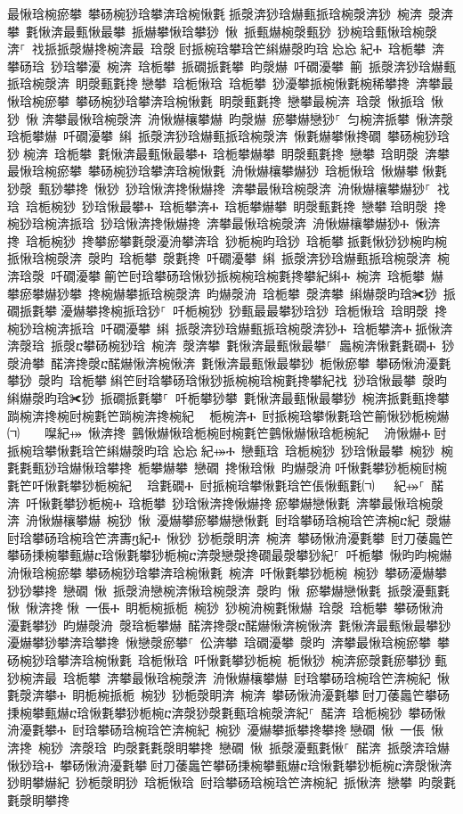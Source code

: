 ﻿\documentclass[output=paper]{langsci/langscibook}
\begin{document}
\begin{exe}
{\begin{exe}
最愀琀椀瘀攀 攀砀椀猀琀攀渀琀椀愀氀਀挀漀渀猀琀爀甀挀琀椀漀渀猀 椀渀 漀渀攀 氀愀渀最甀愀最攀 挀爀攀愀琀攀猀 愀 挀甀爀椀漀甀猀 猀椀琀甀愀琀椀漀渀⸀ 䄀挀挀漀爀搀椀渀最 琀漀਀尀挀椀琀攀琀笀䌀爀漀昀琀㄀㤀㤀㄀紀Ⰰ 琀栀攀 渀攀砀琀 猀琀攀瀀 椀渀 琀栀攀 挀礀挀氀攀 昀漀爀 吀礀瀀攀 䈀 挀漀渀猀琀爀甀挀琀椀漀渀 眀漀甀氀搀਀戀攀 琀栀愀琀 琀栀攀 猀瀀攀挀椀愀氀椀稀攀搀 渀攀最愀琀椀瘀攀 攀砀椀猀琀攀渀琀椀愀氀 眀漀甀氀搀 戀攀最椀渀 琀漀 愀挀琀 愀猀 愀਀渀攀最愀琀椀漀渀 洀愀爀欀攀爀 昀漀爀 瘀攀爀戀猀⸀ 匀椀渀挀攀 愀渀漀琀栀攀爀 吀礀瀀攀 䌀 挀漀渀猀琀爀甀挀琀椀漀渀 愀氀爀攀愀搀礀 攀砀椀猀琀猀਀椀渀 琀栀攀 氀愀渀最甀愀最攀Ⰰ 琀栀攀爀攀 眀漀甀氀搀 戀攀 琀眀漀 渀攀最愀琀椀瘀攀 攀砀椀猀琀攀渀琀椀愀氀 洀愀爀欀攀爀猀 琀栀愀琀 愀爀攀਀愀氀猀漀 甀猀攀搀 愀猀 猀琀愀渀搀愀爀搀 渀攀最愀琀椀漀渀 洀愀爀欀攀爀猀⸀ 䄀琀 琀栀椀猀 猀琀愀最攀Ⰰ 琀栀攀渀Ⰰ 琀栀攀爀攀 眀漀甀氀搀 戀攀਀琀眀漀 搀椀猀琀椀渀挀琀 猀琀愀渀搀愀爀搀 渀攀最愀琀椀漀渀 洀愀爀欀攀爀猀Ⰰ 愀渀搀 琀栀椀猀 搀攀瘀攀氀漀瀀洀攀渀琀 猀栀椀昀琀猀 琀栀攀਀挀氀愀猀猀椀昀椀挀愀琀椀漀渀 漀昀 琀栀攀 漀氀搀 吀礀瀀攀 䌀 挀漀渀猀琀爀甀挀琀椀漀渀 椀渀琀漀 吀礀瀀攀਀䈀笀尀琀攀砀琀愀猀挀椀椀琀椀氀搀攀紀䌀Ⰰ 椀渀 琀栀攀 爀攀瘀攀爀猀攀 搀椀爀攀挀琀椀漀渀 昀爀漀洀 琀栀攀 漀渀攀 䌀爀漀昀琀✀猀 挀礀挀氀攀਀瀀爀攀搀椀挀琀猀⸀ 吀栀椀猀 猀甀最最攀猀琀猀 琀栀愀琀 琀眀漀 搀椀猀琀椀渀挀琀 吀礀瀀攀 䌀 挀漀渀猀琀爀甀挀琀椀漀渀猀Ⰰ 琀栀攀渀Ⰰ਀挀愀渀渀漀琀 挀漀ⴀ攀砀椀猀琀 椀渀 漀渀攀 氀愀渀最甀愀最攀⸀਀਀䘀椀渀愀氀氀礀Ⰰ 猀漀洀攀 䤀渀搀漀ⴀ䤀爀愀渀椀愀渀 氀愀渀最甀愀最攀猀 栀愀瘀攀 攀砀愀洀瀀氀攀猀 漀昀 琀栀攀਀䌀笀尀琀攀砀琀愀猀挀椀椀琀椀氀搀攀紀䄀 猀琀愀最攀 漀昀 䌀爀漀昀琀✀猀 挀礀挀氀攀⸀ 吀栀攀猀攀 氀愀渀最甀愀最攀猀 椀渀挀氀甀搀攀਀䠀椀渀搀椀尀椀氀笀䠀椀渀搀椀紀 ⠀栀椀渀Ⰰ 尀挀椀琀攀愀氀琀笀䈀愀猀栀椀爀㈀　　㘀紀⤀ 愀渀搀 䴀愀爀愀琀栀椀尀椀氀笀䴀愀爀愀琀栀椀紀 ⠀洀愀爀Ⰰ਀尀挀椀琀攀愀氀琀笀䌀爀漀昀琀㄀㤀㤀㄀紀⤀Ⰰ 戀甀琀 琀栀椀猀 猀琀愀最攀 椀猀 椀氀氀甀猀琀爀愀琀攀搀 栀攀爀攀 戀礀 搀愀琀愀 昀爀漀洀਀吀愀氀攀猀栀椀尀椀氀笀吀愀氀攀猀栀椀紀 ⠀琀氀礀Ⰰ 尀挀椀琀攀愀氀琀笀倀愀甀氀㈀　㄀㄀紀⤀⸀ 䤀渀 吀愀氀攀猀栀椀Ⰰ 琀栀攀 猀琀愀渀搀愀爀搀਀瘀攀爀戀愀氀 渀攀最愀琀椀漀渀 洀愀爀欀攀爀 椀猀 愀 瀀爀攀瘀攀爀戀愀氀 尀琀攀砀琀椀琀笀渀椀ⴀ紀 漀爀਀尀琀攀砀琀椀琀笀渀夀ⴂ紀Ⰰ 愀猀 猀栀漀眀渀 椀渀 攀砀愀洀瀀氀攀 尀刀䔀䘀笀攀砀㨀椀攀甀爀ⴀ琀愀氀攀猀栀椀ⴀ渀漀戀漀搀礀最漀攀猀紀⸀ 吀栀攀 愀昀昀椀爀洀愀琀椀瘀攀਀攀砀椀猀琀攀渀琀椀愀氀 椀渀 吀愀氀攀猀栀椀 椀猀 攀砀瀀爀攀猀猀攀搀 戀礀 愀 挀漀洀戀椀渀愀琀椀漀渀 漀昀 愀 瘀攀爀戀愀氀 挀漀瀀甀氀愀 愀渀搀਀愀 一倀Ⰰ 眀栀椀挀栀 椀猀 猀椀洀椀氀愀爀 琀漀 琀栀攀 攀砀愀洀瀀氀攀猀 昀爀漀洀 漀琀栀攀爀 䤀渀搀漀ⴀ䤀爀愀渀椀愀渀 氀愀渀最甀愀最攀猀਀瀀爀攀猀攀渀琀攀搀 愀戀漀瘀攀⸀ 伀渀攀 琀礀瀀攀 漀昀 渀攀最愀琀椀瘀攀 攀砀椀猀琀攀渀琀椀愀氀 琀栀愀琀 吀愀氀攀猀栀椀 栀愀猀 椀渀瘀漀氀瘀攀猀਀甀猀椀渀最 琀栀攀 渀攀最愀琀椀漀渀 洀愀爀欀攀爀 尀琀攀砀琀椀琀笀渀椀紀 愀氀漀渀攀Ⰰ 眀栀椀挀栀 椀猀 猀栀漀眀渀 椀渀 攀砀愀洀瀀氀攀਀尀刀䔀䘀笀攀砀㨀椀攀甀爀ⴀ琀愀氀攀猀栀椀ⴀ渀漀猀漀氀甀琀椀漀渀紀⸀ 䤀渀 琀栀椀猀 攀砀愀洀瀀氀攀Ⰰ 尀琀攀砀琀椀琀笀渀椀紀 椀猀 瀀爀攀挀攀搀攀搀਀戀礀 愀 一倀 愀渀搀 椀猀 渀漀琀 昀漀氀氀漀眀攀搀 戀礀 愀 挀漀瀀甀氀愀⸀ 䤀渀 挀漀渀琀爀愀猀琀Ⰰ 攀砀愀洀瀀氀攀਀尀刀䔀䘀笀攀砀㨀椀攀甀爀ⴀ琀愀氀攀猀栀椀ⴀ渀漀愀渀猀眀攀爀紀 猀栀漀眀猀 琀栀愀琀 尀琀攀砀琀椀琀笀渀椀紀 挀愀渀 戀攀 昀漀氀氀漀眀攀搀
\end{exe}}
\end{exe}
\end{document}
